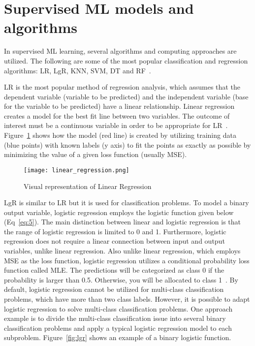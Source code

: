 \section{Supervised ML models and algorithms}

In supervised \gls{ML} learning, several algorithms and computing approaches are utilized. The following are some of the most popular classification and regression algorithms: \gls{LR}, \gls{LgR}, \gls{KNN}, \gls{SVM}, \gls{DT} and \gls{RF}~\cite{2020WhatIBM,Chugh2018TypesKnow}.

\gls{LR} is the most popular method of regression analysis, which assumes that the dependent variable (variable to be predicted) and the independent variable (base for the variable to be predicted) have a linear relationship. Linear regression creates a model for the best fit line between two variables. The outcome of interest must be a continuous variable in order to be appropriate for \gls{LR}~\cite{Worster2007UnderstandingAnalyses}. Figure~\ref{fig:linear_regression} shows how the model (red line) is created by utilizing training data (blue points) with known labels (y axis) to fit the points as exactly as possible by minimizing the value of a given loss function (usually \gls{MSE}).

\begin{figure}[htbp]
    \centering
    \texttt{[image: linear\_regression.png]}
    \caption{Visual representation of Linear Regression~\cite{Nasteski2017AnMethods}}
    \label{fig:linear_regression}
\end{figure}

\gls{LgR} is similar to \gls{LR} but it is used for classification problems. To model a binary output variable, logistic regression employs the logistic function given below (Eq~\ref{eq:5}). The main distinction between linear and logistic regression is that the range of logistic regression is limited to 0 and 1. Furthermore, logistic regression does not require a linear connection between input and output variables, unlike linear regression. Also unlike linear regression, which employs \gls{MSE} as the loss function, logistic regression utilizes a conditional probability loss function called \gls{MLE}. The predictions will be categorized as class 0 if the probability is larger than 0.5. Otherwise, you will be allocated to class 1~\cite{Belyadi2021SupervisedLearning}. By default, logistic regression cannot be utilized for multi-class classification problems, which have more than two class labels. However, it is possible to adapt logistic regression to solve  multi-class classification problems. One approach example is to divide the multi-class classification issue into several binary classification problems and apply a typical logistic regression model to each subproblem. 
Figure~\ref{fig:lgr} shows an example of a binary logistic function. 

